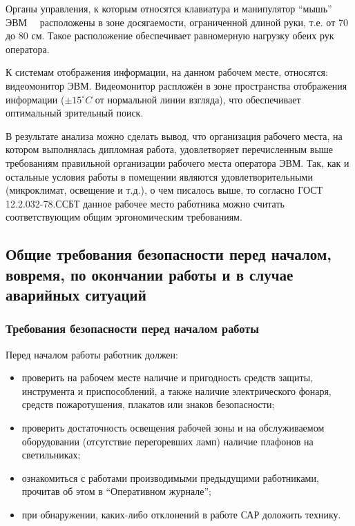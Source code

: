Органы управления, к которым относятся клавиатура и манипулятор ``мышь'' ЭВМ \ \ расположены в зоне досягаемости, ограниченной длиной руки, т.е. от 70 до 80 см. Такое расположение обеспечивает равномерную нагрузку обеих рук оператора.

К системам отображения информации, на данном рабочем месте, относятся: видеомонитор ЭВМ. Видеомонитор распложён в зоне пространства отображения информации ($\pm15^{\circ}C$ от нормальной линии взгляда), что обеспечивает оптимальный зрительный поиск.

В результате анализа можно сделать вывод, что организация рабочего места, на котором выполнялась дипломная работа, удовлетворяет перечисленным выше требованиям правильной организации рабочего места оператора ЭВМ. Так, как и остальные условия работы в помещении являются удовлетворительными (микроклимат, освещение и т.д.), о чем писалось выше, то согласно ГОСТ 12.2.032-78.ССБТ\cite{gost_sec_ergonom_32} данное рабочее место работника можно считать соответствующим общим эргономическим требованиям.

\subsection{Общие требования безопасности перед началом, вовремя, по окончании работы и в случае аварийных ситуаций}
\subsubsection{Требования безопасности перед началом работы}

Перед началом работы работник должен:

\begin{itemize}
\item проверить на рабочем месте наличие и пригодность средств защиты, инструмента и приспособлений, а также наличие электрического фонаря, средств пожаротушения, плакатов или знаков безопасности;
\item проверить достаточность освещения рабочей зоны и на обслуживаемом оборудовании (отсутствие перегоревших ламп) наличие плафонов на светильниках;
\item ознакомиться с работами производимыми предыдущими работниками, прочитав об этом в ``Оперативном журнале'';
\item при обнаружении, каких-либо отклонений в работе САР доложить технику.
\end{itemize}
